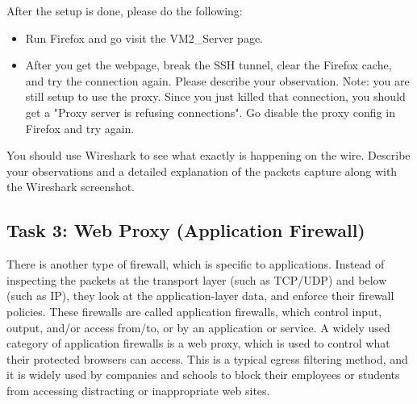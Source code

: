 After the setup is done, please do the following:

\begin{itemize}
\item Run Firefox and go visit the VM2\_Server page. %

\item After you get the webpage, break the SSH tunnel, clear the Firefox cache, and try the connection again. Please describe your observation. Note: you are still setup to use the proxy. Since you just killed that connection, you should get a "Proxy server is refusing connections". Go disable the proxy config in Firefox and try again.\\ 

\end{itemize}%

You should use Wireshark to see what exactly is happening on the wire. Describe your observations and a detailed explanation of the packets capture along with the Wireshark screenshot.\\




\iffalse
\subsection{Task 3: Web Proxy (Application Firewall)}


There is another type of firewall, which is specific to 
applications. Instead of inspecting the packets at 
the transport layer (such as TCP/UDP) and below (such as IP), 
they look at the application-layer data, and enforce 
their firewall policies. These firewalls are called 
application firewalls,  which control input, output,
and/or access from/to, or by an application or service.
A widely used category of application firewalls is a web proxy, 
which is used to control what their protected browsers can
access. This is a typical egress filtering method, and it is widely
used by companies and schools to block their employees 
or students from accessing distracting or inappropriate 
web sites. 


